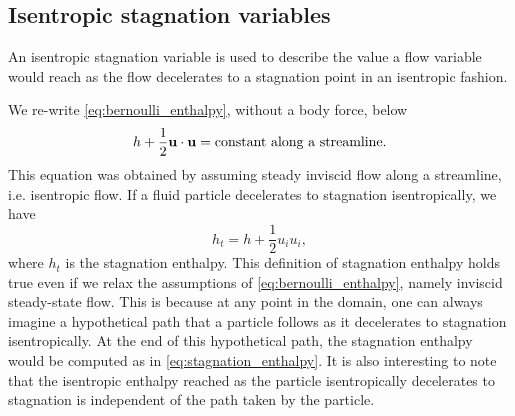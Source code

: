 \documentclass[oneside,a4paper,11pt]{report}
\begin{document}
\subsection{Isentropic stagnation variables}
An isentropic stagnation variable is used to describe the value a flow variable would reach as the flow decelerates to a stagnation point in an isentropic fashion.

We re-write \cref{eq:bernoulli_enthalpy}, without a body force, below 
\begin{equation}
    h + \frac{1}{2} \mathbf{u} \cdot \mathbf{u} = \text{constant along a streamline}.
\end{equation}
This equation was obtained by assuming steady inviscid flow along a streamline, i.e. isentropic flow. If a fluid particle decelerates to stagnation isentropically, we have
\begin{equation}
\label{eq:stagnation_enthalpy}
    h_t = h + \frac{1}{2} u_i u_i,
\end{equation}
where $h_t$ is the stagnation enthalpy. This definition of stagnation enthalpy holds true even if we relax the assumptions of \cref{eq:bernoulli_enthalpy}, namely inviscid steady-state flow. This is because at any point in the domain, one can always imagine a hypothetical path that a particle follows as it decelerates to stagnation isentropically. At the end of this hypothetical path, the stagnation enthalpy would be computed as in \cref{eq:stagnation_enthalpy}. It is also interesting to note that the isentropic enthalpy reached as the particle isentropically decelerates to stagnation is independent of the path taken by the particle.

\end{document}
